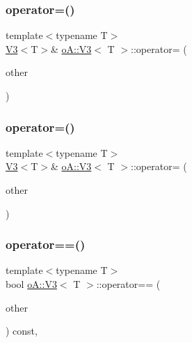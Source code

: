\mbox{\label{structo_a_1_1_v3_a87a850c59abfbf1ad9fbaa15865e24fe}} 
\subsubsection{\texorpdfstring{operator=()}{operator=()}\hspace{0.1cm}{\footnotesize\ttfamily [1/2]}}
{\footnotesize\ttfamily template$<$typename T$>$ \\
\mbox{\hyperlink{structo_a_1_1_v3}{V3}}$<$T$>$\& \mbox{\hyperlink{structo_a_1_1_v3}{o\+A\+::\+V3}}$<$ T $>$\+::operator= (\begin{DoxyParamCaption}\item[{\mbox{\hyperlink{structo_a_1_1_v3}{o\+A\+::\+V3}}$<$ T $>$ \&\&}]{other }\end{DoxyParamCaption})\hspace{0.3cm}{\ttfamily [inline]}}

\mbox{\label{structo_a_1_1_v3_acd2b2489386aa3c917d2b843602da1a8}} 
\subsubsection{\texorpdfstring{operator=()}{operator=()}\hspace{0.1cm}{\footnotesize\ttfamily [2/2]}}
{\footnotesize\ttfamily template$<$typename T$>$ \\
\mbox{\hyperlink{structo_a_1_1_v3}{V3}}$<$T$>$\& \mbox{\hyperlink{structo_a_1_1_v3}{o\+A\+::\+V3}}$<$ T $>$\+::operator= (\begin{DoxyParamCaption}\item[{const \mbox{\hyperlink{structo_a_1_1_v3}{o\+A\+::\+V3}}$<$ T $>$ \&}]{other }\end{DoxyParamCaption})\hspace{0.3cm}{\ttfamily [inline]}}

\mbox{\label{structo_a_1_1_v3_a1291b33d742ccbc7e5b30466c6baa50d}} 
\subsubsection{\texorpdfstring{operator==()}{operator==()}}
{\footnotesize\ttfamily template$<$typename T$>$ \\
bool \mbox{\hyperlink{structo_a_1_1_v3}{o\+A\+::\+V3}}$<$ T $>$\+::operator== (\begin{DoxyParamCaption}\item[{const \mbox{\hyperlink{structo_a_1_1_v3}{o\+A\+::\+V3}}$<$ T $>$ \&}]{other }\end{DoxyParamCaption}) const\hspace{0.3cm}{\ttfamily [inline]}, {\ttfamily [noexcept]}}



